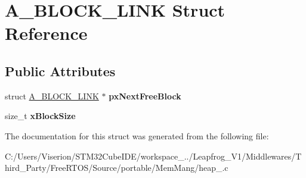 \hypertarget{struct_a___b_l_o_c_k___l_i_n_k}{}\section{A\+\_\+\+B\+L\+O\+C\+K\+\_\+\+L\+I\+NK Struct Reference}
\label{struct_a___b_l_o_c_k___l_i_n_k}
\subsection*{Public Attributes}
\begin{DoxyCompactItemize}
\item 
\mbox{\label{struct_a___b_l_o_c_k___l_i_n_k_a005de4303d4b4e61065e77d97c9774fe}} 
struct \mbox{\hyperlink{struct_a___b_l_o_c_k___l_i_n_k}{A\+\_\+\+B\+L\+O\+C\+K\+\_\+\+L\+I\+NK}} $\ast$ {\bfseries px\+Next\+Free\+Block}
\item 
\mbox{\label{struct_a___b_l_o_c_k___l_i_n_k_ad5dcf5df03d8be6186c567be9e2c657b}} 
size\+\_\+t {\bfseries x\+Block\+Size}
\end{DoxyCompactItemize}


The documentation for this struct was generated from the following file\+:\begin{DoxyCompactItemize}
\item 
C\+:/\+Users/\+Viserion/\+S\+T\+M32\+Cube\+I\+D\+E/workspace\+\_../\+Leapfrog\+\_\+\+V1/\+Middlewares/\+Third\+\_\+\+Party/\+Free\+R\+T\+O\+S/\+Source/portable/\+Mem\+Mang/heap\+\_.\+c\end{DoxyCompactItemize}
